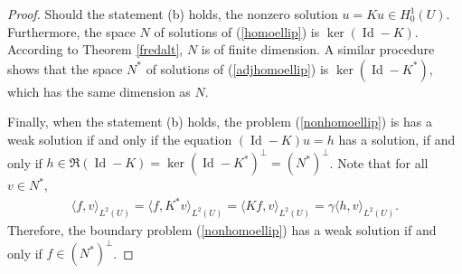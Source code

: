 \documentclass{article}
\numberwithin{equation}{section}
\DeclareMathOperator{\id}{Id}
\theoremstyle{plain}
\theoremstyle{definition}
\begin{document}
\begin{proof}
Should the statement (b) holds, the nonzero solution $u=Ku\in H_0^1(U)$. Furthermore, the space $N$ of solutions of (\ref{homoellip}) is $\ker(\id-K)$. According to Theorem \ref{fredalt}, $N$ is of finite dimension. A similar procedure shows that the space $N^*$ of solutions of (\ref{adjhomoellip}) is $\ker(\id-K^*)$, which has the same dimension as $N$.

Finally, when the statement (b) holds, the problem (\ref{nonhomoellip}) is has a weak solution if and only if the equation $(\id-K)u=h$ has a solution, if and only if $h\in\mathfrak{R}(\id-K)=\ker(\id-K^*)^\perp=(N^*)^\perp$. Note that for all $v\in N^*$,
\begin{align*}
	\langle f,v\rangle_{L^2(U)}=\langle f,K^*v\rangle_{L^2(U)}=\langle Kf,v\rangle_{L^2(U)}=\gamma\langle h,v\rangle_{L^2(U)}.
\end{align*}
Therefore, the boundary problem (\ref{nonhomoellip}) has a weak solution if and only if $f\in(N^*)^\perp$.
\end{proof}
\end{document}
